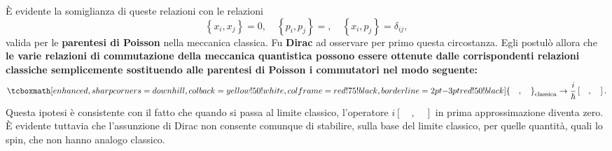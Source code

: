 \documentclass[a4paper,12pt,oneside]{book}
\begin{document}
È evidente la somiglianza di queste relazioni con le relazioni
	\begin{equation}
		\left\{ x_i, x_j\right\}=0,\quad \left\{ p_i, p_j\right\}=, \quad \left\{ x_i, p_j\right\}=\delta _{ij}, 
\end{equation}
valida per le \textbf{parentesi di Poisson} nella meccanica classica. Fu \textbf{Dirac} ad osservare per primo questa circostanza. Egli postulò allora che \textbf{le varie relazioni di commutazione della meccanica quantistica possono essere ottenute dalle corrispondenti relazioni classiche semplicemente sostituendo alle parentesi di Poisson i commutatori nel modo seguente:}
	\begin{equation}
		\tcboxmath[enhanced,sharp corners=downhill ,colback=yellow!50!white,colframe=red!75!black, borderline={2pt}{-3pt}{red!50!black}]{
			\left\{ \quad, \quad \right\} _{\textrm{classica}} \rightarrow \frac{i}{\hbar}\left[ \quad, \quad \right] .
			}
	\end{equation}
Questa ipotesi è consistente con il fatto che quando si passa al limite classico, l'operatore $i\left[ \quad, \quad \right]$ in prima approssimazione diventa zero.\\

È evidente tuttavia che l'assunzione di Dirac non consente comunque di stabilire, sulla base del limite classico, per quelle quantità, quali lo spin, che non hanno analogo classico.
\end{document}
